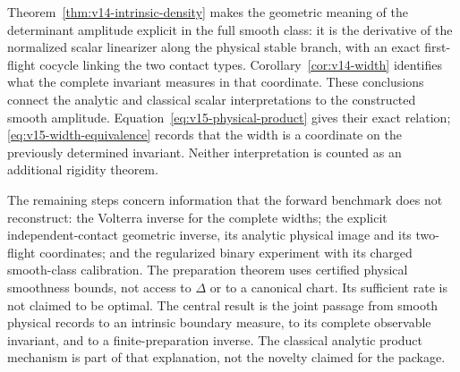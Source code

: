 Theorem~\ref{thm:v14-intrinsic-density} makes the geometric meaning of
the determinant amplitude explicit in the full smooth class: it is
the derivative of the normalized scalar linearizer along the physical
stable branch, with an exact first-flight cocycle linking the two
contact types. Corollary~\ref{cor:v14-width} identifies what the
complete invariant measures in that coordinate. These conclusions
connect the analytic and classical scalar interpretations to the
constructed smooth amplitude. Equation~\eqref{eq:v15-physical-product}
gives their exact relation; \eqref{eq:v15-width-equivalence} records
that the width is a coordinate on the previously determined invariant.
Neither interpretation is counted as an additional rigidity theorem.

The remaining steps concern information that the forward benchmark
does not reconstruct: the Volterra inverse for the complete widths;
the explicit independent-contact geometric inverse, its analytic
physical image and its two-flight coordinates; and the regularized
binary experiment with its charged smooth-class calibration.
The preparation theorem uses certified physical smoothness bounds,
not access to $\Delta$ or to a canonical chart. Its sufficient rate
is not claimed to be optimal. The central result is the joint passage
from smooth physical records to an intrinsic boundary measure, to its
complete observable invariant, and to a finite-preparation inverse.
The classical analytic product mechanism is part of that explanation,
not the novelty claimed for the package.
